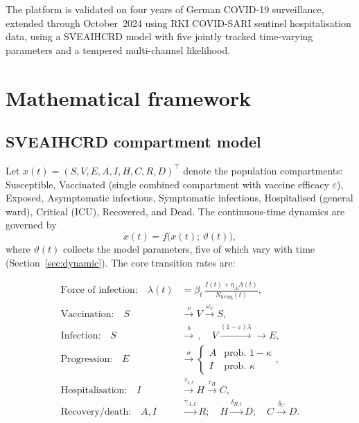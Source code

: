 \documentclass[11pt]{article}
\begin{document}
The platform is validated on four years of German COVID-19 surveillance,
extended through October~2024 using RKI COVID-SARI sentinel hospitalisation
data, using a SVEAIHCRD model with five jointly tracked time-varying
parameters and a tempered multi-channel likelihood.


\section{Mathematical framework}
\label{sec:math}

\subsection{SVEAIHCRD compartment model}
\label{sec:model}

Let $x(t)=(S,V,E,A,I,H,C,R,D)^{\!\top}$ denote the population compartments:
Susceptible, Vaccinated (single combined compartment with vaccine efficacy
$\varepsilon$), Exposed, Asymptomatic infectious, Symptomatic infectious,
Hospitalised (general ward), Critical (ICU), Recovered, and Dead.
The continuous-time dynamics are governed by
\[
  \dot{x}(t) = f\!\bigl(x(t);\,\vartheta(t)\bigr),
\]
where $\vartheta(t)$ collects the model parameters, five of which vary
with time (Section~\ref{sec:dynamic}).  The core transition rates are:

\begin{align}
\text{Force of infection:}\quad
  \lambda(t) &= \beta_t\,\frac{I(t)+\eta_A A(t)}{N_{\mathrm{living}}(t)},
  \label{eq:foi}\\
\text{Vaccination:}\quad
  S &\xrightarrow{\nu} V \xrightarrow{\omega_V} S, \nonumber \\
\text{Infection:}\quad
  S &\xrightarrow{\lambda}\,,\quad
  V \xrightarrow{(1-\varepsilon)\lambda} \to E, \nonumber \\
\text{Progression:}\quad
  E &\xrightarrow{\sigma}
    \begin{cases} A & \text{prob.\ } 1-\kappa \\ I & \text{prob.\ } \kappa \end{cases},
  \nonumber \\
\text{Hospitalisation:}\quad
  I &\xrightarrow{\tau_{I,t}} H \xrightarrow{\tau_H} C, \nonumber \\
\text{Recovery/death:}\quad
  A,I &\xrightarrow{\gamma_{A,I}} R;\quad
  H \xrightarrow{\delta_{H,t}} D;\quad
  C \xrightarrow{\delta_C} D. \nonumber
\end{align}
\end{document}
